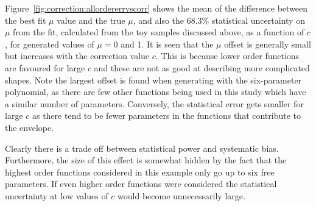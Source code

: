 Figure~\ref{fig:correction:allordererrvscorr} shows the mean of the difference
between the best fit $\mu$ value and the true $\mu$, and also the 68.3\%
statistical uncertainty on $\mu$ from the fit, calculated from the toy
samples discussed above, as a function of $c$,
for generated values of $\mu=0$ and 1. It is seen that the $\mu$ offset
is generally small but increases with the correction value $c$. This is
because lower order functions are favoured for large $c$ and these are not as good at
describing more complicated shapes. Note the largest
offset is found when generating with the six-parameter polynomial, as there
are few other functions being used in this study which have a similar number
of parameters.
Conversely, the
statistical error gets smaller for large $c$ as there tend to be fewer parameters
in the functions that contribute to the envelope.

Clearly there is a trade off between statistical power and systematic bias. Furthermore, the
size of this effect is somewhat hidden by the fact that the highest order functions considered
in this example only go up to six free parameters. If even higher order functions were considered
the statistical uncertainty at low values of $c$ would become unnecessarily large.

